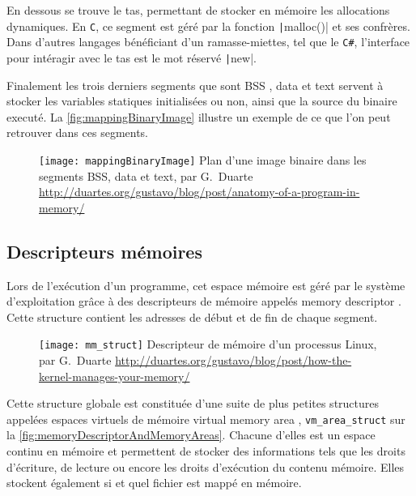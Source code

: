 En dessous se trouve le tas, permettant de stocker en mémoire les allocations dynamiques. En \texttt{C}, ce segment est géré par la fonction \texttt|malloc()| et ses confrères. Dans d'autres langages bénéficiant d'un ramasse-miettes, tel que le \texttt{C\#}, l'interface pour intéragir avec le tas est le mot réservé \texttt|new|.

Finalement les trois derniers segments que sont \og BSS \fg, \og data \fg et \og text \fg servent à stocker les variables statiques initialisées ou non, ainsi que la source du binaire executé. La \autoref{fig:mappingBinaryImage} illustre un exemple de ce que l'on peut retrouver dans ces segments.

\begin{figure}[H]
	\centering
	\texttt{[image: mappingBinaryImage]}
	{Plan d'une image binaire dans les segments BSS, data et text, par G.~Duarte}
	{\url{http://duartes.org/gustavo/blog/post/anatomy-of-a-program-in-memory/}}
	\label{fig:mappingBinaryImage}
\end{figure}

\subsection{Descripteurs mémoires}

Lors de l'exécution d'un programme, cet espace mémoire est géré par le système d'exploitation grâce à des descripteurs de mémoire appelés \og memory descriptor \fg. Cette structure contient les adresses de début et de fin de chaque segment.

\begin{figure}[H]
	\centering
	\texttt{[image: mm\_struct]}
	{Descripteur de mémoire d'un processus Linux, par G.~Duarte}
	{\url{http://duartes.org/gustavo/blog/post/how-the-kernel-manages-your-memory/}}
	\label{fig:mm_struct}
\end{figure}

Cette structure globale est constituée d'une suite de plus petites structures appelées espaces virtuels de mémoire \og virtual memory area \fg, \texttt{vm_area_struct} sur la \autoref{fig:memoryDescriptorAndMemoryAreas}. Chacune d'elles est un espace continu en mémoire et permettent de stocker des informations tels que les droits d'écriture, de lecture ou encore les droits d'exécution du contenu mémoire. Elles stockent également si et quel fichier est mappé en mémoire.

